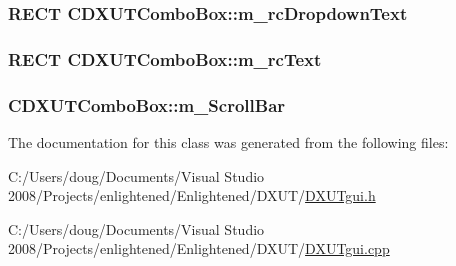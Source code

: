 \label{class_c_d_x_u_t_combo_box_a9dbf700ec2d33fb50397fb24e11a34a1}
\hypertarget{class_c_d_x_u_t_combo_box_a7e48109d7bcd08b41a2ebfa2b69a5b92}{
\subsubsection[{m\_\-rcDropdownText}]{\setlength{\rightskip}{0pt plus 5cm}RECT {\bf CDXUTComboBox::m\_\-rcDropdownText}}}
\label{class_c_d_x_u_t_combo_box_a7e48109d7bcd08b41a2ebfa2b69a5b92}
\hypertarget{class_c_d_x_u_t_combo_box_a39744f7d6e1e6aec8523b35223f45d9a}{
\subsubsection[{m\_\-rcText}]{\setlength{\rightskip}{0pt plus 5cm}RECT {\bf CDXUTComboBox::m\_\-rcText}}}
\label{class_c_d_x_u_t_combo_box_a39744f7d6e1e6aec8523b35223f45d9a}
\hypertarget{class_c_d_x_u_t_combo_box_aa1f843f80e2acfe7fb7eff78f2814451}{
\subsubsection[{m\_\-ScrollBar}]{ {\bf CDXUTComboBox::m\_\-ScrollBar}}}
\label{class_c_d_x_u_t_combo_box_aa1f843f80e2acfe7fb7eff78f2814451}


The documentation for this class was generated from the following files:\begin{DoxyCompactItemize}
\item 
C:/Users/doug/Documents/Visual Studio 2008/Projects/enlightened/Enlightened/DXUT/\hyperlink{_d_x_u_tgui_8h}{DXUTgui.h}\item 
C:/Users/doug/Documents/Visual Studio 2008/Projects/enlightened/Enlightened/DXUT/\hyperlink{_d_x_u_tgui_8cpp}{DXUTgui.cpp}\end{DoxyCompactItemize}
